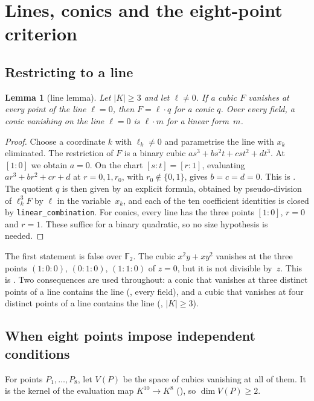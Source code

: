 \documentclass[11pt]{article}
\newtheorem{lemma}[theorem]{Lemma}
\theoremstyle{definition}
\theoremstyle{remark}
\newcommand{\lean}[1]{\texttt{#1}}
\newcommand{\F}{\mathbb{F}}
\begin{document}
\section{Lines, conics and the eight-point criterion}\label{sec:criterion}

\subsection{Restricting to a line}

\begin{lemma}[line lemma]\label{lem:line}
Let $|K|\ge3$ and let $\ell\ne0$. If a cubic $F$ vanishes at every point of the line $\ell=0$,
then $F=\ell\cdot q$ for a conic $q$. Over every field, a conic vanishing on the line
$\ell=0$ is $\ell\cdot m$ for a linear form~$m$.
\end{lemma}

\begin{proof}
Choose a coordinate $k$ with $\ell_k\ne0$ and parametrise the line with $x_k$ eliminated. The
restriction of $F$ is a binary cubic $a s^3+b s^2t+c st^2+dt^3$. At $[1:0]$ we obtain $a=0$. On the chart $[s:t]=[r:1]$, evaluating $a r^3+b r^2+c r+d$ at
$r=0,1,r_0$, with $r_0\notin\{0,1\}$, gives $b=c=d=0$. This is
. The quotient $q$ is then given by an explicit
formula, obtained by pseudo-division of $\ell_k^3F$ by $\ell$ in the variable~$x_k$, and each of
the ten coefficient identities is closed by \lean{linear\_combination}. For conics, every line
has the three points $[1:0]$, $r=0$ and $r=1$. These suffice for a binary quadratic, so no size
hypothesis is needed.
\end{proof}

The first statement is false over $\F_2$. The cubic $x^2y+xy^2$ vanishes at the three points
$(1:0:0)$, $(0:1:0)$, $(1:1:0)$ of $z=0$, but it is not divisible by~$z$. This is
. Two consequences are used throughout: a conic that vanishes at
three distinct points of a line contains the line (, every field), and a cubic
that vanishes at four distinct points of a line contains the line (, $|K|\ge3$).

\subsection{When eight points impose independent conditions}

For points $P_1,\dots,P_8$, let $V(P)$ be the space of cubics vanishing at all of them. It is the
kernel of the evaluation map $K^{10}\to K^8$ (), so $\dim V(P)\ge 2$.
\end{document}
